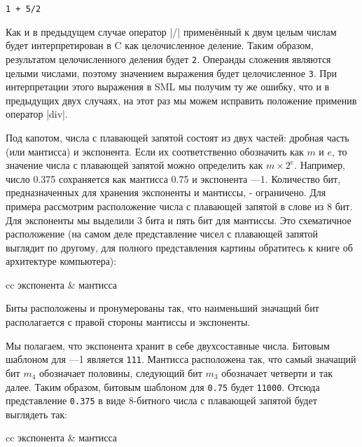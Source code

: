 \begin{lstlisting}[style=customml]
1 + 5/2
\end{lstlisting}

Как и в предыдущем случае оператор \inline|/| применённый к двум целым числам будет интерпретирован в C как целочисленное деление. Таким образом, результатом целочисленного деления будет \lstinline|2|. Операнды сложения являются целыми числами, поэтому значением выражения будет целочисленное \lstinline|3|. При интерпретации этого выражения в SML мы получим ту же ошибку, что и в предыдущих двух случаях, на этот раз мы можем исправить положение применив оператор \inline|div|.

Под капотом, числа с плавающей запятой состоят из двух частей: дробная часть (или мантисса) и экспонента. Если их соответственно обозначить как $m$ и $e$, то значение числа с плавающей запятой можно определить как $m \times 2^e$. Например, число 0.375 сохраняется как мантисса 0.75 и экспонента ---1. Количество бит, предназначенных для хранения экспоненты и мантиссы, - ограничено. Для примера рассмотрим расположение числа с плавающей запятой в слове из 8 бит. Для экспоненты мы выделили 3 бита и пять бит для мантиссы. Это схематичное расположение (на самом деле представление чисел с плавающей запятой выглядит по другому, для полного представления картины обратитесь к книге об архитектуре компьютера):

\begin{tabular}{cc}
  экспонента & мантисса \\
\end{tabular}

Биты расположены и пронумерованы так, что наименьший значащий бит располагается с правой стороны мантиссы и экспоненты.

Мы полагаем, что экспонента хранит в себе двухсоставные числа. Битовым шаблоном для ---1 является \lstinline|111|. Мантисса расположена так, что самый значащий бит $m_4$ обозначает половины, следующий бит $m_3$ обозначает четверти и так далее. Таким образом, битовым шаблоном для \lstinline|0.75| будет \lstinline|11000|. Отсюда представление \lstinline|0.375| в виде 8-битного числа с плавающей запятой будет выглядеть так:

\begin{tabular}{cc}
  экспонента & мантисса \\
\end{tabular}

